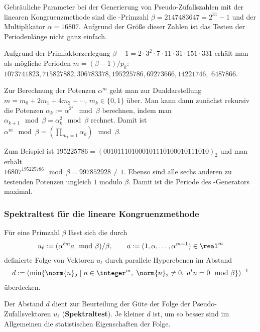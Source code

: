 \linie

Gebräuliche Parameter bei der Generierung von Pseudo-Zufallszahlen mit der
linearen Kongruenzmethode sind die -Primzahl
$\beta = 2147483647 = 2^{31} - 1$ und der Multiplikator $\alpha = 16807$.
Aufgrund der Größe dieser Zahlen ist das Testen der Periodenlänge
nicht ganz einfach.

Aufgrund der Primfaktorzerlegung
$\beta - 1 = 2 \cdot 3^2 \cdot 7 \cdot 11 \cdot 31 \cdot 151 \cdot 331$
erhält man als mögliche Perioden $m = (\beta - 1)/p_k$:
$1073741823, 715827882, 306783378, 195225786, 69273666, 14221746,$
$6487866$.

Zur Berechnung der Potenzen $\alpha^m$ geht man zur Dualdarstellung
$m = m_0 + 2m_1 + 4m_2 + \dotsb$, $m_k \in \{0, 1\}$ über.
Man kann dann zunächst rekursiv die Potenzen
$\alpha_k := \alpha^{2^k} \mod \beta$ berechnen, indem man
$\alpha_{k+1} \mod \beta = \alpha_k^2 \mod \beta$ rechnet.
Damit ist
$\alpha^m \mod \beta = (\prod_{m_k=1} \alpha_k) \mod \beta$.

Zum Beispiel ist $195225786 = (001011101000101110100010111010)_2$
und man erhält \\
$16807^{195225786} \mod \beta = 997852928 \not= 1$.
Ebenso sind alle sechs anderen zu testenden Potenzen ungleich $1$ modulo
$\beta$.
Damit ist die Periode des -Generators maximal.

\pagebreak

\subsubsection{%
    Spektraltest für die lineare Kongruenzmethode%
}

Für eine Primzahl $\beta$ lässt sich die durch
\begin{align*}
    u_\ell := (\alpha^{\ell m} a \mod \beta) / \beta, \qquad
    a := (1, \alpha, \dotsc, \alpha^{m-1}) \in \real^m
\end{align*}
definierte Folge von Vektoren $u_\ell$ durch parallele Hyperebenen im Abstand
\begin{align*}
    d := (\min\{\norm{n}_2 \;|\; n \in \integer^m,\; \norm{n}_2 \not= 0,\;
    a^t n = 0 \mod \beta\})^{-1}
\end{align*}
überdecken.

Der Abstand $d$ dient zur Beurteilung der Güte der Folge der
Pseudo-Zufallsvektoren $u_\ell$ (\textbf{Spektraltest}).
Je kleiner $d$ ist, um so besser sind im Allgemeinen die statistischen
Eigenschaften der Folge.

